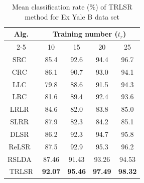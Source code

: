 %
\begin{table}
\caption{Mean classification rate ($\%$) of TRLSR method for Ex Yale B data set}
\label{table: TRLSR_Accuracy_Yale_train}
\centering
\small
\begin{tabular}{|c|cccc|}
\hline
\multirow{2}{*}{Alg.} & \multicolumn{4}{c|}{Training number ($t_r$)}                                                                                      \\ \cline{2-5} 
                      & \multicolumn{1}{c|}{10}             & \multicolumn{1}{c|}{15}             & \multicolumn{1}{c|}{20}             & 25             \\ \hline
SRC~\cite{SRC}                   & \multicolumn{1}{c|}{85.4}           & \multicolumn{1}{c|}{92.6}           & \multicolumn{1}{c|}{94.4}           & 96.7           \\ \hline
CRC~\cite{CRC}                   & \multicolumn{1}{c|}{86.1}           & \multicolumn{1}{c|}{90.7}           & \multicolumn{1}{c|}{93.0}           & 94.1           \\ \hline
LLC~\cite{LLC}                   & \multicolumn{1}{c|}{79.8}           & \multicolumn{1}{c|}{88.6}           & \multicolumn{1}{c|}{91.5}           & 94.3           \\ \hline
LRC~\cite{LRC}                   & \multicolumn{1}{c|}{81.6}           & \multicolumn{1}{c|}{89.4}           & \multicolumn{1}{c|}{92.4}           & 93.6           \\ \hline
LRLR~\cite{LRLR_SLRR}                  & \multicolumn{1}{c|}{84.6}           & \multicolumn{1}{c|}{82.0}           & \multicolumn{1}{c|}{83.8}           & 85.0           \\ \hline
SLRR~\cite{LRLR_SLRR}                  & \multicolumn{1}{c|}{87.9}           & \multicolumn{1}{c|}{82.3}           & \multicolumn{1}{c|}{84.2}           & 85.1           \\ \hline
DLSR~\cite{DLSR}                  & \multicolumn{1}{c|}{86.2}           & \multicolumn{1}{c|}{92.3}           & \multicolumn{1}{c|}{94.7}           & 95.8           \\ \hline
ReLSR~\cite{ReLSR}                 & \multicolumn{1}{c|}{87.5}           & \multicolumn{1}{c|}{92.9}           & \multicolumn{1}{c|}{95.3}           & 96.2           \\ \hline
RSLDA~\cite{RSLDA}                 & \multicolumn{1}{c|}{87.46}          & \multicolumn{1}{c|}{91.43}          & \multicolumn{1}{c|}{93.26}          & 94.53          \\ \hline
TRLSR                 & \multicolumn{1}{c|}{\textbf{92.07}} & \multicolumn{1}{c|}{\textbf{95.46}} & \multicolumn{1}{c|}{\textbf{97.49}} & \textbf{98.32} \\ \hline
\end{tabular}
\end{table}
%
